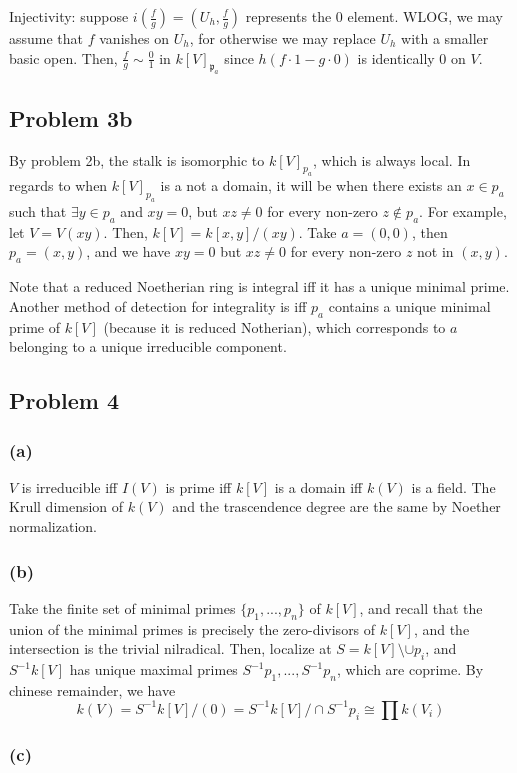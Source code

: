 \documentclass{article}
\theoremstyle{definition}
\theoremstyle{definition}
\theoremstyle{definition}
\theoremstyle{definition}
\theoremstyle{definition}
\theoremstyle{definition}
\theoremstyle{definition}
\begin{document}
Injectivity: suppose $i(\frac{f}{g})=(U_h,\frac{f}{g})$ represents the $0$ element. WLOG, we may assume that $f$ vanishes on $U_h$, for otherwise we may replace $U_h$ with a smaller basic open. Then, $\frac{f}{g}\sim \frac{0}{1}$ in $ k[V]_{\mathfrak{p}_a}$ since $h(f\cdot 1-g\cdot 0)$ is identically $0$ on $V$.

\subsection*{Problem 3b}
By problem 2b, the stalk is isomorphic to $k[V]_{p_a}$, which is always local. In regards to when $k[V]_{p_a}$ is a not a domain, it will be when there exists an $x\in p_a$ such that $\exists y\in p_a$ and $xy=0$, but $xz\neq 0$ for every non-zero $z\not \in p_a$. For example, let $V=V(xy)$. Then, $k[V]=k[x,y]/(xy)$. Take $a=(0,0)$, then $p_a=(x,y)$, and we have $xy=0$ but $xz\neq 0$ for every non-zero $z$ not in $(x,y)$. 

Note that a reduced Noetherian ring is integral iff it has a unique minimal prime. Another method of detection for integrality is iff $p_a$ contains a unique minimal prime of $k[V]$ (because it is reduced Notherian), which corresponds to $a$ belonging to a unique irreducible component.

\subsection*{Problem 4}
\subsubsection*{(a)}
$V$ is irreducible iff $I(V)$ is prime iff $k[V]$ is a domain iff $k(V)$ is a field. The Krull dimension of $k(V)$ and the trascendence degree are the same by Noether normalization.
\subsubsection*{(b)}
Take the finite set of minimal primes $\{p_1,...,p_n\}$ of $k[V]$, and recall that the union of the minimal primes is precisely the zero-divisors of $k[V]$, and the intersection is the trivial nilradical. Then, localize at $S=k[V]\setminus \cup p_i$, and $S^{-1}k[V]$ has unique maximal primes $S^{-1}p_1,...,S^{-1}p_n$, which are coprime. By chinese remainder, we have
\[k(V)=S^{-1}k[V]/(0)=S^{-1}k[V]/\cap S^{-1}p_i\cong \prod k(V_i)  \]
\subsubsection*{(c)}
\end{document}
